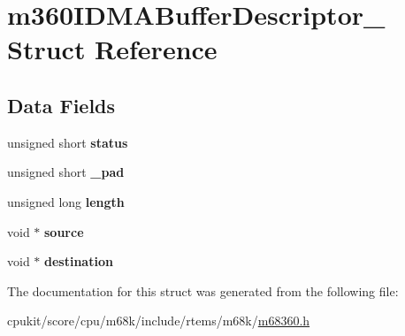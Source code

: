 \hypertarget{structm360IDMABufferDescriptor__}{}\section{m360\+I\+D\+M\+A\+Buffer\+Descriptor\+\_\+ Struct Reference}
\label{structm360IDMABufferDescriptor__}
\subsection*{Data Fields}
\begin{DoxyCompactItemize}
\item 
\mbox{\label{structm360IDMABufferDescriptor___ad47e6b93a298b756292e4c61bc93aa32}} 
unsigned short {\bfseries status}
\item 
\mbox{\label{structm360IDMABufferDescriptor___a7d9638ac58c68c6c42e166e8e4843df6}} 
unsigned short {\bfseries \+\_\+pad}
\item 
\mbox{\label{structm360IDMABufferDescriptor___ae13ea4f46d3900baee8883224a8a3750}} 
unsigned long {\bfseries length}
\item 
\mbox{\label{structm360IDMABufferDescriptor___a47c9111279439a38956906bbe9e399f2}} 
void $\ast$ {\bfseries source}
\item 
\mbox{\label{structm360IDMABufferDescriptor___ab51e687b6c21ce2d91d139290af3e329}} 
void $\ast$ {\bfseries destination}
\end{DoxyCompactItemize}


The documentation for this struct was generated from the following file\+:\begin{DoxyCompactItemize}
\item 
cpukit/score/cpu/m68k/include/rtems/m68k/\mbox{\hyperlink{m68360_8h}{m68360.\+h}}\end{DoxyCompactItemize}
